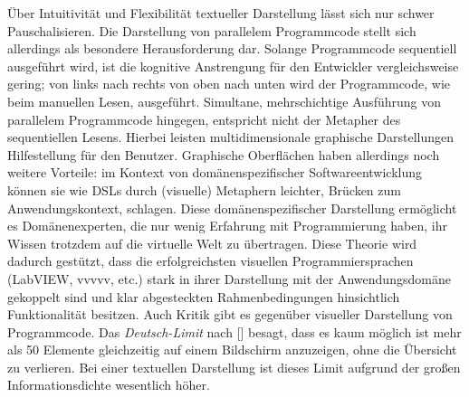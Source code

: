 Über Intuitivität und Flexibilität textueller Darstellung lässt sich nur schwer Pauschalisieren. Die Darstellung von parallelem Programmcode stellt sich allerdings als besondere Herausforderung dar. Solange Programmcode sequentiell ausgeführt wird, ist die kognitive Anstrengung für den Entwickler vergleichsweise gering; von links nach rechts von oben nach unten wird der Programmcode, wie beim manuellen Lesen, ausgeführt. Simultane, mehrschichtige Ausführung von parallelem Programmcode hingegen, entspricht nicht der Metapher des sequentiellen Lesens. Hierbei leisten multidimensionale graphische Darstellungen Hilfestellung für den Benutzer. Graphische Oberflächen haben allerdings noch weitere Vorteile: im Kontext von domänenspezifischer Softwareentwicklung können sie wie \acp{DSL} durch (visuelle) Metaphern leichter, Brücken zum Anwendungskontext, schlagen. Diese domänenspezifischer Darstellung ermöglicht es Domänenexperten, die nur wenig Erfahrung mit Programmierung haben, ihr Wissen trotzdem auf die virtuelle Welt zu übertragen. Diese Theorie wird dadurch gestützt, dass die erfolgreichsten visuellen Programmiersprachen (LabVIEW, vvvvv, etc.) stark in ihrer Darstellung mit der Anwendungsdomäne gekoppelt sind und klar abgesteckten Rahmenbedingungen hinsichtlich Funktionalität besitzen. Auch Kritik gibt es gegenüber visueller Darstellung von Programmcode. Das \textit{Deutsch-Limit} nach [\cite{begel1996logoblocks}] besagt, dass es kaum möglich ist mehr als 50 Elemente gleichzeitig auf einem Bildschirm anzuzeigen, ohne die Übersicht zu verlieren. Bei einer textuellen Darstellung ist dieses Limit aufgrund der großen Informationsdichte wesentlich höher.

